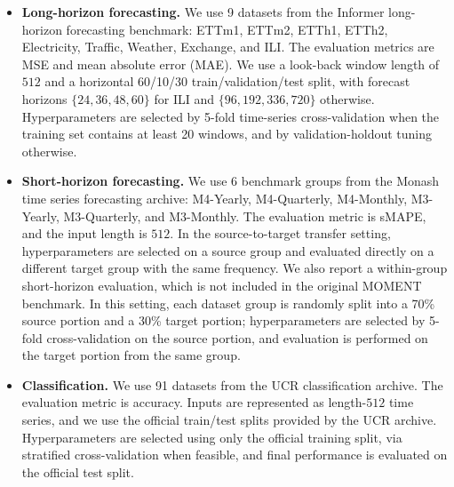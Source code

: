 \documentclass[12pt]{article}
\theoremstyle{definition}
\begin{document}
\begin{itemize}
    \item \textbf{Long-horizon forecasting.} We use 9 datasets from the Informer long-horizon forecasting benchmark: ETTm1, ETTm2, ETTh1, ETTh2, Electricity, Traffic, Weather, Exchange, and ILI. The evaluation metrics are MSE and mean absolute error (MAE). We use a look-back window length of $512$ and a horizontal 60/10/30 train/validation/test split, with forecast horizons $\{24,36,48,60\}$ for ILI and $\{96,192,336,720\}$ otherwise. Hyperparameters are selected by 5-fold time-series cross-validation when the training set contains at least 20 windows, and by validation-holdout tuning otherwise.

    \item \textbf{Short-horizon forecasting.} We use 6 benchmark groups from the Monash time series forecasting archive: M4-Yearly, M4-Quarterly, M4-Monthly, M3-Yearly, M3-Quarterly, and M3-Monthly. The evaluation metric is sMAPE, and the input length is $512$. In the source-to-target transfer setting, hyperparameters are selected on a source group and evaluated directly on a different target group with the same frequency. We also report a within-group short-horizon evaluation, which is not included in the original MOMENT benchmark. In this setting, each dataset group is randomly split into a 70\% source portion and a 30\% target portion; hyperparameters are selected by 5-fold cross-validation on the source portion, and evaluation is performed on the target portion from the same group.

    \item \textbf{Classification.} We use 91 datasets from the UCR classification archive. The evaluation metric is accuracy. Inputs are represented as length-$512$ time series, and we use the official train/test splits provided by the UCR archive. Hyperparameters are selected using only the official training split, via stratified cross-validation when feasible, and final performance is evaluated on the official test split.
\end{itemize}
\end{document}
